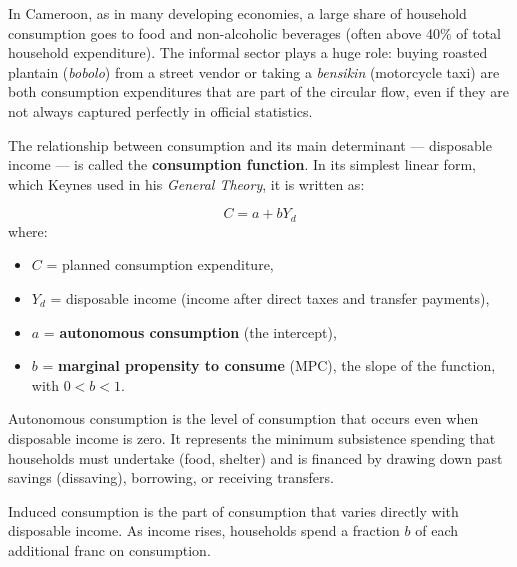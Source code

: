 \documentclass[11pt]{article}
\newcounter{popsec}
\newcounter{popsub}
\newcommand{\courssub}[1]{%
  \stepcounter{popsub}%
  \par\vspace{9pt}\noindent{\popxbold\fontsize{11.5}{13}\selectfont\color{popink}{\color{poporange}\thepopsec.\thepopsub}\hspace{6pt}#1}\par\nopagebreak\vspace{4pt}
}
\begin{document}
\begin{savaistu}
In Cameroon, as in many developing economies, a large share of household consumption goes to food and non-alcoholic beverages (often above 40\% of total household expenditure). The informal sector plays a huge role: buying roasted plantain (\emph{bobolo}) from a street vendor or taking a \emph{bensikin} (motorcycle taxi) are both consumption expenditures that are part of the circular flow, even if they are not always captured perfectly in official statistics.
\end{savaistu}

\courssub{The consumption function}

The relationship between consumption and its main determinant — disposable income — is called the \textbf{consumption function}. In its simplest linear form, which Keynes used in his \emph{General Theory}, it is written as:

\begin{propriete}
\[
C = a + bY_d
\]
where:
\begin{itemize}
    \item $C$ = planned consumption expenditure,
    \item $Y_d$ = disposable income (income after direct taxes and transfer payments),
    \item $a$ = \textbf{autonomous consumption} (the intercept),
    \item $b$ = \textbf{marginal propensity to consume} (MPC), the slope of the function, with $0 < b < 1$.
\end{itemize}
\end{propriete}

\begin{definition}
Autonomous consumption is the level of consumption that occurs even when disposable income is zero. It represents the minimum subsistence spending that households must undertake (food, shelter) and is financed by drawing down past savings (dissaving), borrowing, or receiving transfers.
\end{definition}

\begin{definition}
Induced consumption is the part of consumption that varies directly with disposable income. As income rises, households spend a fraction $b$ of each additional franc on consumption.
\end{definition}
\end{document}
